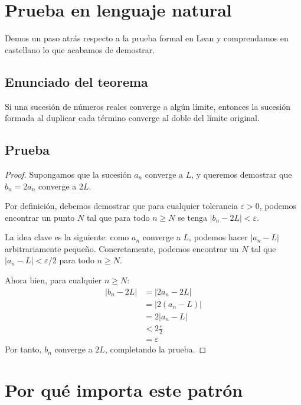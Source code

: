 \section{Prueba en lenguaje natural}

Demos un paso atrás respecto a la prueba formal en Lean y comprendamos
en castellano lo que acabamos de demostrar.

\subsection{Enunciado del teorema}

\begin{theorem}
Si una sucesión de números reales converge a algún límite, entonces la sucesión
formada al duplicar cada término converge al doble del límite original.
\end{theorem}

\subsection{Prueba}

\begin{proof}
Supongamos que la sucesión $a_n$ converge a $L$, y queremos demostrar que
$b_n = 2a_n$ converge a $2L$.

Por definición, debemos demostrar que para cualquier tolerancia $\varepsilon > 0$,
podemos encontrar un punto $N$ tal que para todo $n \geq N$ se tenga
$|b_n - 2L| < \varepsilon$.

La idea clave es la siguiente: como $a_n$ converge a $L$, podemos hacer
$|a_n - L|$ arbitrariamente pequeño. Concretamente, podemos encontrar un $N$
tal que $|a_n - L| < \varepsilon/2$ para todo $n \geq N$.

Ahora bien, para cualquier $n \geq N$:
\begin{align}
  |b_n - 2L| &= |2a_n - 2L| \\
             &= |2(a_n - L)| \\
             &= 2|a_n - L| \\
             &< 2\frac{\varepsilon}{2} \\
             &= \varepsilon
\end{align}
Por tanto, $b_n$ converge a $2L$, completando la prueba.
\end{proof}

\section{Por qué importa este patrón}

